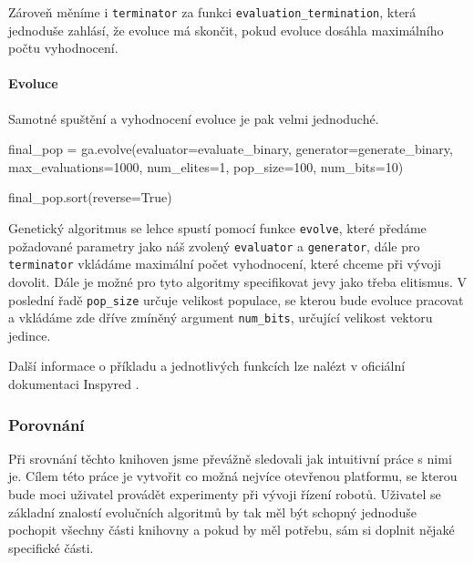 Zároveň měníme i \texttt{terminator} za funkci \texttt{evaluation\_termination},
která jednoduše zahlásí, že evoluce má skončit, pokud evoluce dosáhla
maximálního počtu vyhodnocení.

\paragraph{Evoluce}
Samotné spuštění a vyhodnocení evoluce je pak velmi jednoduché.

\begin{code}
final_pop = ga.evolve(evaluator=evaluate_binary,
                      generator=generate_binary,
                      max_evaluations=1000,
                      num_elites=1,
                      pop_size=100,
                      num_bits=10)

final_pop.sort(reverse=True)
\end{code}

Genetický algoritmus se lehce spustí pomocí funkce \texttt{evolve}, které předáme
požadované parametry jako náš zvolený \texttt{evaluator} a \texttt{generator},
dále pro \texttt{terminator} vkládáme maximální počet vyhodnocení, které chceme
při vývoji dovolit. Dále je možné pro tyto algoritmy specifikovat jevy jako
třeba elitismus. V poslední řadě \texttt{pop\_size} určuje velikost populace,
se kterou bude evoluce pracovat a vkládáme zde dříve zmíněný argument
\texttt{num\_bits}, určující velikost vektoru jedince. 

Další informace o příkladu a jednotlivých funkcích lze nalézt v oficiální
dokumentaci Inspyred \citep{InspyredDocs}.


\subsubsection{Porovnání} \label{GA - Porovnání}
Při srovnání těchto knihoven jsme převážně sledovali jak intuitivní práce s
nimi je. Cílem této práce je vytvořit co možná nejvíce otevřenou platformu, se
kterou bude moci uživatel provádět experimenty při vývoji řízení robotů.
Uživatel se základní znalostí evolučních algoritmů by tak měl být schopný
jednoduše pochopit všechny části knihovny a pokud by měl potřebu, sám si
doplnit nějaké specifické části. 

